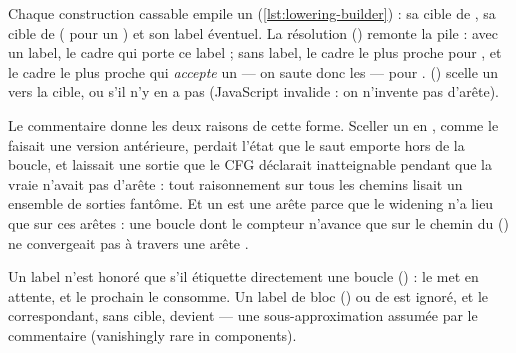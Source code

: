 
Chaque construction \og cassable\fg{} empile un  (\cref{lst:lowering-builder}) : sa cible de , sa cible de  ( pour un ) et son label éventuel. La résolution () remonte la pile : avec un label, le cadre qui porte ce label ; sans label, le cadre le plus proche pour , et le cadre le plus proche qui \emph{accepte} un  --- on saute donc les  --- pour .  () scelle un  vers la cible, ou  s'il n'y en a pas (JavaScript invalide : on n'invente pas d'arête).

Le commentaire donne les deux raisons de cette forme. Sceller un  en , comme le faisait une version antérieure, perdait l'état que le saut emporte hors de la boucle, et laissait une sortie que le CFG déclarait inatteignable pendant que la vraie n'avait pas d'arête : tout raisonnement \og sur tous les chemins\fg{} lisait un ensemble de sorties fantôme. Et un  est une arête  parce que le widening n'a lieu que sur ces arêtes : une boucle dont le compteur n'avance que sur le chemin du  () ne convergeait pas à travers une arête .

Un label n'est honoré que s'il étiquette directement une boucle () :  le met en attente, et le prochain  le consomme. Un label de bloc () ou de  est ignoré, et le  correspondant, sans cible, devient  --- une sous-approximation assumée par le commentaire (\og vanishingly rare in components\fg{}).

